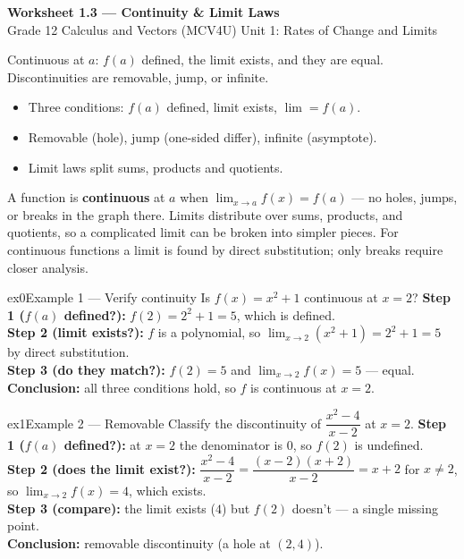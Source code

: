 \documentclass[11pt]{article}
\begin{document}
\begin{center}
{\LARGE\bfseries\color{titleblue}Worksheet 1.3 --- Continuity \& Limit Laws}\\[2pt]
{\small Grade 12 Calculus and Vectors (MCV4U) \textperiodcentered{} Unit 1: Rates of Change and Limits}
\end{center}

\begin{ideabox}
Continuous at $a$: $f(a)$ defined, the limit exists, and they are equal. Discontinuities are removable, jump, or infinite.
\begin{itemize}[leftmargin=*,itemsep=2pt]
  \item Three conditions: $f(a)$ defined, limit exists, $\lim=f(a)$.
  \item Removable (hole), jump (one-sided differ), infinite (asymptote).
  \item Limit laws split sums, products and quotients.
\end{itemize}
\end{ideabox}

\begin{learnbox}
A function is \textbf{continuous} at $a$ when $\lim_{x\to a}f(x)=f(a)$ — no holes, jumps, or breaks in the graph there.
Limits distribute over sums, products, and quotients, so a complicated limit can be broken into simpler pieces.
For continuous functions a limit is found by direct substitution; only breaks require closer analysis.
\end{learnbox}


\begin{example}{ex0}{Example 1 --- Verify continuity}
Is $f(x)=x^2+1$ continuous at $x=2$?\soln
\textbf{Step 1 ($f(a)$ defined?):} $f(2)=2^2+1=5$, which is defined.\\[3pt]
\textbf{Step 2 (limit exists?):} $f$ is a polynomial, so $\lim_{x\to2}(x^2+1)=2^2+1=5$ by direct substitution.\\[3pt]
\textbf{Step 3 (do they match?):} $f(2)=5$ and $\lim_{x\to2}f(x)=5$ --- equal.\\[3pt]
\textbf{Conclusion:} all three conditions hold, so $f$ is continuous at $x=2$.
\end{example}

\begin{example}{ex1}{Example 2 --- Removable}
Classify the discontinuity of $\dfrac{x^2-4}{x-2}$ at $x=2$.\soln
\textbf{Step 1 ($f(a)$ defined?):} at $x=2$ the denominator is $0$, so $f(2)$ is undefined.\\[3pt]
\textbf{Step 2 (does the limit exist?):} $\dfrac{x^2-4}{x-2}=\dfrac{(x-2)(x+2)}{x-2}=x+2$ for $x\ne2$, so $\lim_{x\to2}f(x)=4$, which exists.\\[3pt]
\textbf{Step 3 (compare):} the limit exists ($4$) but $f(2)$ doesn't --- a single missing point.\\[3pt]
\textbf{Conclusion:} removable discontinuity (a hole at $(2,4)$).
\end{example}
\end{document}
